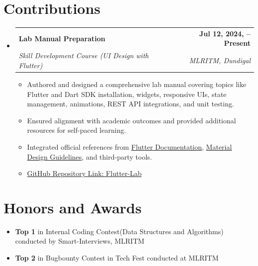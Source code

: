 \documentclass[a4paper,11pt]{article}
\makeatletter
\newcommand{\resumeItem}[1]{\item\small{{#1 \vspace{-2pt}}}}
\newcommand{\resumeSubheading}[4]{
  \vspace{-2pt}\item
    \begin{tabular*}{0.97\textwidth}[t]{l@{\extracolsep{\fill}}r}
      \textbf{#1} & \textbf{\small #2} \\
      \textit{\small#3} & \textit{\small #4} \\
    \end{tabular*}\vspace{-7pt}
}
\newcommand{\resumeSubHeadingListStart}{\begin{itemize}[leftmargin=0.15in, label={}]}
\newcommand{\resumeSubHeadingListEnd}{\end{itemize}}
\newcommand{\resumeItemListStart}{\begin{itemize}}
\newcommand{\resumeItemListEnd}{\end{itemize}\vspace{-5pt}}
\makeatother
\begin{document}
\section{Contributions}
  \resumeSubHeadingListStart
    \resumeSubheading
      {Lab Manual Preparation}{Jul 12, 2024, -- Present}
      {Skill Development Course (UI Design with Flutter)}{MLRITM, Dundigal}
      \resumeItemListStart
        \resumeItem{Authored and designed a comprehensive lab manual covering topics like Flutter and Dart SDK installation, widgets, responsive UIs, state management, animations, REST API integrations, and unit testing.}
        \resumeItem{Ensured alignment with academic outcomes and provided additional resources for self-paced learning.}
        \resumeItem{Integrated official references from \href{https://flutter.dev}{Flutter Documentation}, \href{https://material.io}{Material Design Guidelines}, and third-party tools.}
          \resumeItem{\href{https://github.com/srinu2003/Flutter-Lab}{GitHub Repository Link: Flutter-Lab}}
              \resumeItemListEnd
          \resumeSubHeadingListEnd

\vspace{-11pt}
\section{Honors and Awards}
  \resumeItemListStart[parsep = -2pt]
    \resumeItem{\textbf{Top 1} in Internal Coding Contest(Data Structures and Algorithms) conducted by Smart-Interviews, MLRITM}
    \resumeItem{\textbf{Top 2} in Bugbounty Contest in Tech Fest conducted at MLRITM}
  \resumeItemListEnd

\end{document}
